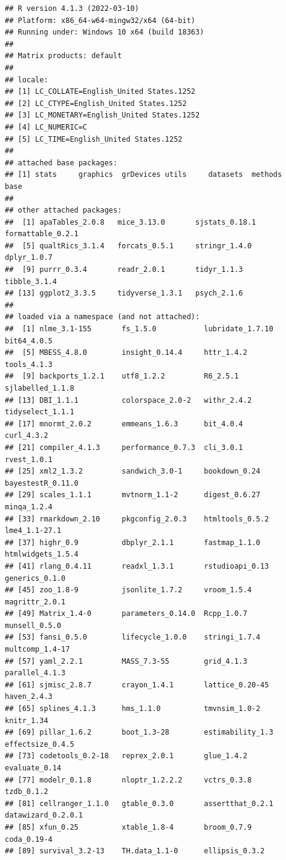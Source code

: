 \documentclass[
]{book}
\begin{document}
\begin{verbatim}
## R version 4.1.3 (2022-03-10)
## Platform: x86_64-w64-mingw32/x64 (64-bit)
## Running under: Windows 10 x64 (build 18363)
## 
## Matrix products: default
## 
## locale:
## [1] LC_COLLATE=English_United States.1252 
## [2] LC_CTYPE=English_United States.1252   
## [3] LC_MONETARY=English_United States.1252
## [4] LC_NUMERIC=C                          
## [5] LC_TIME=English_United States.1252    
## 
## attached base packages:
## [1] stats     graphics  grDevices utils     datasets  methods   base     
## 
## other attached packages:
##  [1] apaTables_2.0.8   mice_3.13.0       sjstats_0.18.1    formattable_0.2.1
##  [5] qualtRics_3.1.4   forcats_0.5.1     stringr_1.4.0     dplyr_1.0.7      
##  [9] purrr_0.3.4       readr_2.0.1       tidyr_1.1.3       tibble_3.1.4     
## [13] ggplot2_3.3.5     tidyverse_1.3.1   psych_2.1.6      
## 
## loaded via a namespace (and not attached):
##  [1] nlme_3.1-155       fs_1.5.0           lubridate_1.7.10   bit64_4.0.5       
##  [5] MBESS_4.8.0        insight_0.14.4     httr_1.4.2         tools_4.1.3       
##  [9] backports_1.2.1    utf8_1.2.2         R6_2.5.1           sjlabelled_1.1.8  
## [13] DBI_1.1.1          colorspace_2.0-2   withr_2.4.2        tidyselect_1.1.1  
## [17] mnormt_2.0.2       emmeans_1.6.3      bit_4.0.4          curl_4.3.2        
## [21] compiler_4.1.3     performance_0.7.3  cli_3.0.1          rvest_1.0.1       
## [25] xml2_1.3.2         sandwich_3.0-1     bookdown_0.24      bayestestR_0.11.0 
## [29] scales_1.1.1       mvtnorm_1.1-2      digest_0.6.27      minqa_1.2.4       
## [33] rmarkdown_2.10     pkgconfig_2.0.3    htmltools_0.5.2    lme4_1.1-27.1     
## [37] highr_0.9          dbplyr_2.1.1       fastmap_1.1.0      htmlwidgets_1.5.4 
## [41] rlang_0.4.11       readxl_1.3.1       rstudioapi_0.13    generics_0.1.0    
## [45] zoo_1.8-9          jsonlite_1.7.2     vroom_1.5.4        magrittr_2.0.1    
## [49] Matrix_1.4-0       parameters_0.14.0  Rcpp_1.0.7         munsell_0.5.0     
## [53] fansi_0.5.0        lifecycle_1.0.0    stringi_1.7.4      multcomp_1.4-17   
## [57] yaml_2.2.1         MASS_7.3-55        grid_4.1.3         parallel_4.1.3    
## [61] sjmisc_2.8.7       crayon_1.4.1       lattice_0.20-45    haven_2.4.3       
## [65] splines_4.1.3      hms_1.1.0          tmvnsim_1.0-2      knitr_1.34        
## [69] pillar_1.6.2       boot_1.3-28        estimability_1.3   effectsize_0.4.5  
## [73] codetools_0.2-18   reprex_2.0.1       glue_1.4.2         evaluate_0.14     
## [77] modelr_0.1.8       nloptr_1.2.2.2     vctrs_0.3.8        tzdb_0.1.2        
## [81] cellranger_1.1.0   gtable_0.3.0       assertthat_0.2.1   datawizard_0.2.0.1
## [85] xfun_0.25          xtable_1.8-4       broom_0.7.9        coda_0.19-4       
## [89] survival_3.2-13    TH.data_1.1-0      ellipsis_0.3.2
\end{verbatim}
\end{document}
